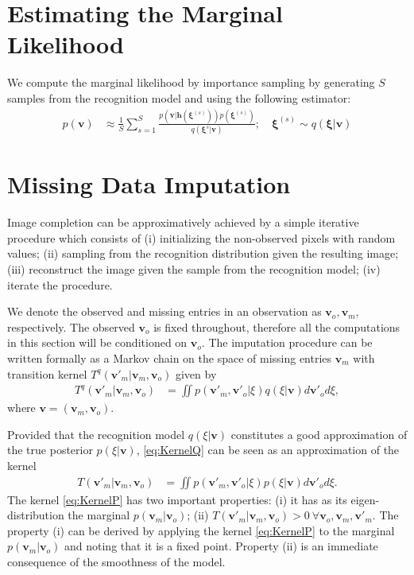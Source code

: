 \documentclass{article}
\newcommand{\vis}{\ensuremath{\mathbf{v}}} %
\newcommand{\myvec}[1]{\mbox{$\mathbf{#1}$}}
\newcommand{\myvecsym}[1]{\mbox{$\boldsymbol{#1}$}}
\newcommand{\vxi}{\mbox{$\myvecsym{\xi}$}}
\newcommand{\vh}{\mbox{$\myvec{h}$}}
\begin{document}
\begin{bibunit}[icml2013]

\section{Estimating the Marginal Likelihood}
\label{sec:app_margLik}
We compute the marginal likelihood by importance sampling by generating $S$ samples from the recognition model and using the following estimator:
\begin{align}
p(\vis) & \approx \frac{1}{S} \sum_{s = 1}^S \frac{p(\vis | 
\vh(\vxi^{(s)})) p(\vxi^{(s)})}{q(\vxi^{s}| \vis )} ; \quad \vxi^{(s)}\sim q(\vxi 
| \vis) \label{eq:FEresults}
\end{align}
 
\section{Missing Data Imputation}
\label{ap:ImageCompletion}
Image completion can be approximatively achieved by a simple iterative 
procedure which consists of (i) initializing the non-observed pixels with 
random values; (ii) sampling from the recognition distribution given the 
resulting image; (iii) reconstruct the image given the sample from the 
recognition model; (iv) iterate the procedure.

We denote the observed and missing entries in an observation as $\vis_o, 
\vis_m$, respectively. The observed $\vis_o$ is fixed throughout, therefore 
all the computations in this section will be conditioned on $\vis_o$.
The  imputation procedure can be written formally as 
a Markov chain on the space of missing entries $\vis_m$ with transition 
kernel $T^q( \vis'_m | \vis_m, \vis_o) $ 
given by
\begin{align}
T^q( \vis'_m | \vis_m, \vis_o ) &= \iint p( \vis'_m, \vis'_o | \xi ) q( \xi| \vis )  d \vis'_o d \xi,
\label{eq:KernelQ}
\end{align}
where $\vis = ( \vis_m, \vis_o )$.

Provided that the recognition model $q( \xi| \vis )$ constitutes a good 
approximation of the true posterior $p( \xi| \vis )$, \eqref{eq:KernelQ} can 
be seen as an approximation of the kernel
\begin{align}
T( \vis'_m | \vis_m, \vis_o ) &= \iint p(\vis'_m, \vis'_o | \xi ) p( \xi| \vis)  d \vis'_o d \xi.
\label{eq:KernelP}
\end{align}
The kernel \eqref{eq:KernelP} has two important properties: (i) it has as its
eigen-distribution the marginal $p(\vis_m| \vis_o)$; (ii) $T(\vis'_m 
|
\vis_m, \vis_o) > 0 ~\forall \vis_o,\vis_m,\vis'_m$. The property (i) can be derived by applying the 
kernel \eqref{eq:KernelP} to the marginal $p(\vis_m| \vis_o)$ and noting 
that it is a fixed point. Property (ii) is an immediate consequence of the 
smoothness of the model.


\end{bibunit}
\end{document}
